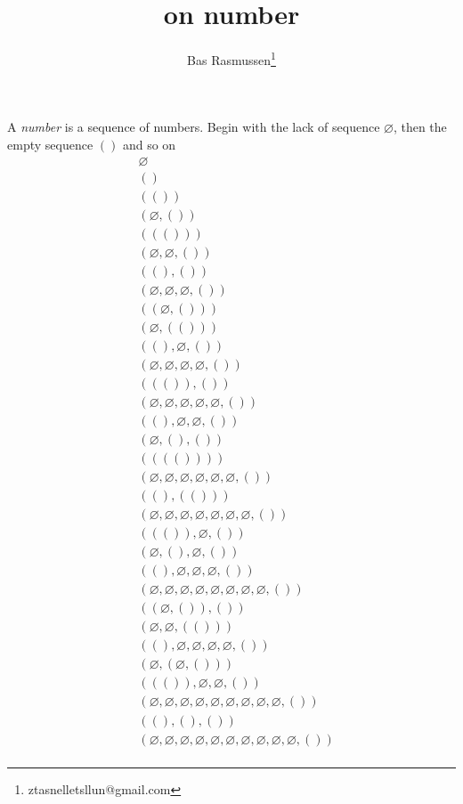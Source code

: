 \documentclass[12pt]{article}
\title{on number}
\author{Bas Rasmussen\thanks{ztasnelletsllun@gmail.com}}
\def\qua{()}
\newcommand{\quat}[1]{\left( #1 \right)}
\def\nul{\varnothing}
\begin{document}
\maketitle

A \emph{number} is a sequence of numbers.  Begin with the lack of sequence $\nul$, then the empty sequence $\qua$ and so on
\begin{align*}
&\nul\\
&\qua\\
&\quat{\qua}\\
&\quat{\nul,\qua}\\
&\quat{\quat{\qua}}\\
&\quat{\nul,\nul,\qua}\\
&\quat{\qua,\qua}\\
&\quat{\nul,\nul,\nul,\qua}\\
&\quat{\quat{\nul,\qua}}\\
&\quat{\nul,\quat{\qua}}\\
&\quat{\qua,\nul,\qua}\\
&\quat{\nul,\nul,\nul,\nul,\qua}\\
&\quat{\quat{\qua},\qua}\\
&\quat{\nul,\nul,\nul,\nul,\nul,\qua}\\
&\quat{\qua,\nul,\nul,\qua}\\
&\quat{\nul,\qua,\qua}\\
&\quat{\quat{\quat{\qua}}}\\
&\quat{\nul,\nul,\nul,\nul,\nul,\nul,\qua}\\
&\quat{\qua,\quat{\qua}}\\
&\quat{\nul,\nul,\nul,\nul,\nul,\nul,\nul,\qua}\\
&\quat{\quat{\qua},\nul,\qua}\\
&\quat{\nul,\qua,\nul,\qua}\\
&\quat{\qua,\nul,\nul,\nul,\qua}\\
&\quat{\nul,\nul,\nul,\nul,\nul,\nul,\nul,\nul,\qua}\\
&\quat{\quat{\nul,\qua},\qua}\\
&\quat{\nul,\nul,\quat{\qua}}\\
&\quat{\qua,\nul,\nul,\nul,\nul,\qua}\\
&\quat{\nul,\quat{\nul,\qua}}\\
&\quat{\quat{\qua},\nul,\nul,\qua}\\
&\quat{\nul,\nul,\nul,\nul,\nul,\nul,\nul,\nul,\nul,\qua}\\
&\quat{\qua,\qua,\qua}\\
&\quat{\nul,\nul,\nul,\nul,\nul,\nul,\nul,\nul,\nul,\nul,\qua}\\

\end{align*}
\end{document}
